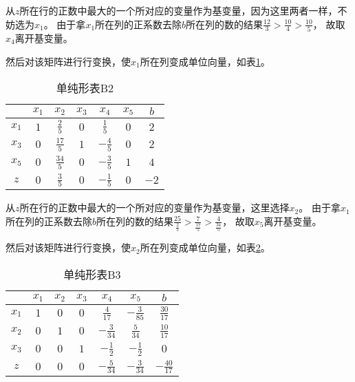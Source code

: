 \begin{solution}
\begin{enumerate}
      从$z$所在行的正数中最大的一个所对应的变量作为基变量，因为这里两者一样，不妨选为$x_1$。
      由于拿$x_1$所在列的正系数去除$b$所在列的数的结果$\frac{12}{3}>\frac{10}{4}>\frac{10}{5}$，
      故取$x_{4}$离开基变量。

      然后对该矩阵进行行变换，使$x_1$所在列变成单位向量，如表\ref{tb2}。
      
      \begin{table}[!h]
         \centering
         \caption{单纯形表B2}
         \label{tb2}
         \begin{tabular}{c|cccccc} 
         \toprule
                &$x_1$  &$x_2$  &$x_3$  &$x_4$  &$x_5$  &$b$   \\\hline
         $x_1$  &$1$    &$\frac{2}{5}$    &$0$     &$\frac{1}{5}$  &$0$  &$2$   \\
         $x_3$  &$0$    &$\frac{17}{5}$    &$1$    &$-\frac{4}{5}$   &$0$ &$2$   \\
         $x_5$  &$0$    &$\frac{34}{5}$     &$0$   &$-\frac{3}{5}$  &$1$  &$4$   \\
         $z$    &$0$    &$\frac{3}{5}$    &$0$     &$-\frac{1}{5}$  &$0$  &$-2$   \\
         \bottomrule
         \end{tabular}
      \end{table}

      从$z$所在行的正数中最大的一个所对应的变量作为基变量，这里选择$x_2$。
      由于拿$x_1$所在列的正系数去除$b$所在列的数的结果$\frac{25}{\frac{2}{5}}>\frac{7}{\frac{17}{5}}>\frac{4}{\frac{34}{5}}$，
      故取$x_{5}$离开基变量。

      然后对该矩阵进行行变换，使$x_2$所在列变成单位向量，如表\ref{tb3}。

      \begin{table}[!h]
         \centering
         \caption{单纯形表B3}
         \label{tb3}
         \begin{tabular}{c|cccccc} 
         \toprule
                &$x_1$  &$x_2$  &$x_3$  &$x_4$  &$x_5$  &$b$   \\\hline
         $x_1$  &$1$    &$0$    &$0$    &$\frac{4}{17}$    &$-\frac{3}{85}$    &$\frac{30}{17}$   \\
         $x_2$  &$0$    &$1$    &$0$    &$-\frac{3}{34}$    &$\frac{5}{34}$    &$\frac{10}{17}$   \\
         $x_3$  &$0$    &$0$    &$1$    &$-\frac{1}{2}$    &$-\frac{1}{2}$    &$0$   \\
         $z$    &$0$    &$0$    &$0$    &$-\frac{5}{34}$    &$-\frac{3}{34}$    &$-\frac{40}{17}$   \\
         \bottomrule
         \end{tabular}
      \end{table}


\end{enumerate}
\end{solution}
